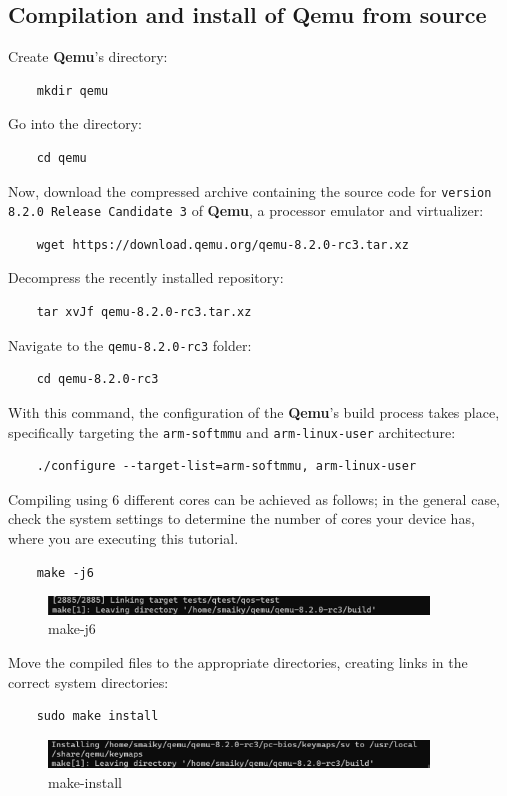 \documentclass{exam}
\begin{document}
\subsection{Compilation and install of Qemu from source}
Create \textbf{Qemu}'s directory:
\begin{lstlisting}
    mkdir qemu
\end{lstlisting}
Go into the directory:
\begin{lstlisting}
    cd qemu
\end{lstlisting}
Now, download the compressed archive containing the source code for \texttt{version 8.2.0 Release Candidate 3} of \textbf{Qemu}, a processor emulator and virtualizer:
\begin{lstlisting}
    wget https://download.qemu.org/qemu-8.2.0-rc3.tar.xz
\end{lstlisting}
Decompress the recently installed repository:
\begin{lstlisting}
    tar xvJf qemu-8.2.0-rc3.tar.xz
\end{lstlisting}
Navigate to the \texttt{qemu-8.2.0-rc3} folder:
\begin{lstlisting}
    cd qemu-8.2.0-rc3
\end{lstlisting}
With this command, the configuration of the \textbf{Qemu}'s build process takes place, specifically targeting the \texttt{arm-softmmu} and \texttt{arm-linux-user} architecture:
\begin{lstlisting}
    ./configure --target-list=arm-softmmu, arm-linux-user
\end{lstlisting}
Compiling using 6 different cores can be achieved as follows; in the general case, check the system settings to determine the number of cores your device has, where you are executing this tutorial.
\begin{lstlisting}
    make -j6
\end{lstlisting}
\begin{figure}[h]
    \centering
    \includegraphics[width=0.90\textwidth]{graphics/make-j6.png}
    \caption{make-j6}
    \label{fig:riferimentoNelTestoNelCasoVogliaCitareLimmagine}
\end{figure}
Move the compiled files to the appropriate directories, creating links in the correct system directories:
\begin{lstlisting}
    sudo make install
\end{lstlisting}
\begin{figure}[h]
    \centering
    \includegraphics[width=0.90\textwidth]{graphics/make-install.png}
    \caption{make-install}
    \label{fig:riferimentoNelTestoNelCasoVogliaCitareLimmagine}
\end{figure}
\end{document}
